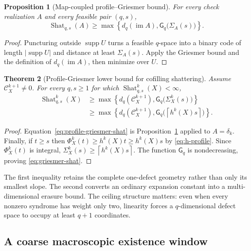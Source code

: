\documentclass[11pt,letterpaper]{article}
\theoremstyle{plain}
\newtheorem{theorem}{Theorem}[section]
\newtheorem{proposition}[theorem]{Proposition}
\theoremstyle{definition}
\newcommand{\cC}{\mathcal{C}}
\newcommand{\supp}{\operatorname{supp}}
\newcommand{\im}{\operatorname{im}}
\newcommand{\Shat}{\operatorname{Shat}}
\newcommand{\1}{\mathbf{1}}
\newcommand{\abs}[1]{\left|#1\right|}
\newcommand{\set}[1]{\left\{#1\right\}}
\newcommand{\ceil}[1]{\left\lceil#1\right\rceil}
\begin{document}
\begin{proposition}[Map-coupled profile--Griesmer bound]
\label{prop:map-profile-griesmer}
For every check realization $A$ and every feasible pair $(q,s)$,
\begin{equation}\label{eq:map-profile-griesmer}
 \Shat_{q,s}(A)\ge
 \max\set{d_q(\im A),\mathsf G_q\bigl(\Sigma_A(s)\bigr)}.
\end{equation}
\end{proposition}

\begin{proof}
Puncturing outside $\supp U$ turns a feasible $q$-space into a binary code
of length $\abs{\supp U}$ and distance at least $\Sigma_A(s)$.  Apply the
Griesmer bound and the definition of $d_q(\im A)$, then minimize over $U$.
\end{proof}

\begin{theorem}[Profile-Griesmer lower bound for cofilling shattering]
\label{thm:griesmer-shat}
Assume $\cC_X^{k+1}\ne0$.  For every $q,s\ge1$ for which
$\Shat_{q,s}^k(X)<\infty$,
\begin{align}
 \Shat_{q,s}^k(X)
 &\ge
 \max\set{
 d_q(\cC_X^{k+1}),
 \mathsf G_q\bigl(\Sigma_X^k(s)\bigr)
 }
 \label{eq:profile-griesmer-shat}\\
 &\ge
 \max\set{
 d_q(\cC_X^{k+1}),
 \mathsf G_q\bigl(\ceil{h^k(X)s}\bigr)
 }.
 \label{eq:griesmer-shat}
\end{align}
\end{theorem}

\begin{proof}
Equation~\eqref{eq:profile-griesmer-shat} is
Proposition~\ref{prop:map-profile-griesmer} applied to $A=\delta_k$.
Finally, if $t\ge s$ then
$\Phi_X^k(t)\ge h^k(X)t\ge h^k(X)s$ by \eqref{eq:h-profile}.  Since
$\Phi_X^k(t)$ is integral, $\Sigma_X^k(s)\ge\ceil{h^k(X)s}$.  The function
$\mathsf G_q$ is nondecreasing, proving \eqref{eq:griesmer-shat}.
\end{proof}

The first inequality retains the complete one-defect geometry rather than only its
smallest slope.  The second converts an ordinary expansion constant into a
multi-dimensional erasure bound.  The ceiling structure matters: even when every
nonzero syndrome has weight only two, linearity forces a $q$-dimensional defect space
to occupy at least $q+1$ coordinates.

\subsection{A coarse macroscopic existence window}
\end{document}
